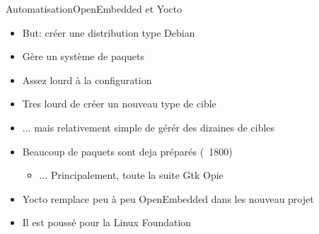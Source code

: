\begin{frame}[fragile=singleslide]{Automatisation}{OpenEmbedded et Yocto}
  \begin{itemize}
  \item But: créer une distribution type Debian
  \item Gère un système de paquets
  \item Assez lourd à la configuration
  \item Tres lourd de créer un nouveau type de cible
  \item ... mais relativement simple de gérér des dizaines de cibles
  \item Beaucoup de paquets sont deja préparés (~1800)
    \begin{itemize}
    \item ... Principalement, toute la suite Gtk Opie
    \end{itemize}
  \item Yocto remplace peu à peu OpenEmbedded dans les nouveau projet
  \item Il est poussé pour la Linux Foundation

  \end{itemize}
\end{frame}

